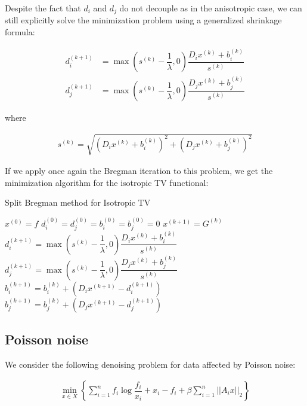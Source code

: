 Despite the fact that $d_i$ and $d_j$ do not decouple as in the anisotropic case, we can still explicitly solve the minimization problem using a generalized shrinkage formula:

\begin{align*}
d_i^{(k+1)} &= \max \left(s^{(k)} - \dfrac{1}{\lambda},0\right) \dfrac{D_i x^{(k)} + b_i^{(k)}}{s^{(k)}} \\
d_j^{(k+1)} &= \max \left(s^{(k)} - \dfrac{1}{\lambda},0\right) \dfrac{D_j x^{(k)} + b_j^{(k)}}{s^{(k)}}
\end{align*}

where

\begin{align}
\label{iso:sk} s^{(k)} = \sqrt{\left(D_i x^{(k)} + b_i^{(k)}\right)^2 + \left(D_j x^{(k)} + b_j^{(k)}\right)^2}
\end{align}

If we apply once again the Bregman iteration to this problem, we get the minimization algorithm for the isotropic TV functional:

\begin{algorithm}[H]
\caption{Split Bregman method for Isotropic TV}
\begin{algorithmic}
\STATE $x^{(0)} = f$
\STATE
\STATE $d_i^{(0)} = d_j^{(0)} = b_i^{(0)} = b_j^{(0)}=0$
\STATE
{}
\STATE
\STATE $x^{(k+1)} = G^{(k)}$
\STATE
\STATE $d_i^{(k+1)} = \max \left(s^{(k)} - \dfrac{1}{\lambda},0\right) \dfrac{D_i x^{(k)} + b_i^{(k)}}{s^{(k)}}$
\STATE
\STATE $d_j^{(k+1)} = \max \left(s^{(k)} - \dfrac{1}{\lambda},0\right) \dfrac{D_j x^{(k)} + b_j^{(k)}}{s^{(k)}}$
\STATE
\STATE $b_i^{(k+1)} = b_i^{(k)} + \left(D_i x^{(k+1)} - d_i^{(k+1)}\right)$
\STATE
\STATE $b_j^{(k+1)} = b_j^{(k)} + \left(D_j x^{(k+1)} - d_j^{(k+1)}\right)$
\ENDWHILE
\end{algorithmic}
\end{algorithm}

\subsection{Poisson noise}

We consider the following denoising problem for data affected by Poisson noise:

\begin{align}
\label{pidproblem}
\min_{x \in X} \left\{ \sum_{i=1}^n f_i \log{\dfrac{f_i}{x_i}}+x_i-f_i + \beta \sum_{i=1}^n ||A_i x||_2 \right\}
\end{align}

